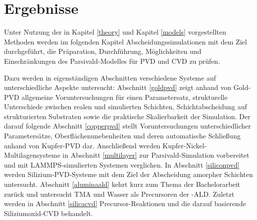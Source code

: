 \cleardoublepage
\chapter{Ergebnisse}

Unter Nutzung der in Kapitel \ref{theory} und Kapitel \ref{models} vorgestellten Methoden werden im folgenden Kapitel Abscheidungssimulationen mit dem Ziel durchgeführt, die Präparation, Durchführung, Möglichkeiten und Einschränkungen des Parsivald-Modelles für PVD und CVD zu prüfen.

Dazu werden in eigenständigen Abschnitten verschiedene Systeme auf unterschiedliche Aspekte untersucht:
Abschnitt \ref{goldpvd} zeigt anhand von Gold-PVD allgemeine Voruntersuchungen für einen Parametersatz, strukturelle Unterschiede zwischen realen und simulierten Schichten, Schichtabscheidung auf strukturierten Substraten sowie die praktische Skalierbarkeit der Simulation.
Der darauf folgende Abschnitt \ref{copperpvd} stellt Voruntersuchungen unterschiedlicher Parametersätze, Oberflächenunebenheiten und deren automatische Schließung anhand von Kupfer-PVD dar.
Anschließend werden Kupfer-Nickel-Multilagensysteme in Abschnitt \ref{multilayer} zur Parsivald-Simulation vorbereitet und mit LAMMPS-simulierten Systemen verglichen.
In Abschnitt \ref{siliconpvd} werden Silizium-PVD-Systeme mit dem Ziel der Abscheidung amorpher Schichten untersucht.
Abschnitt \ref{aluminaald} kehrt kurz zum Thema der Bachelorarbeit zurück und untersucht TMA und Wasser als Precursoren der -ALD.
Zuletzt werden in Abschnitt \ref{silicacvd} Precursor-Reaktionen und die darauf basierende Siliziumoxid-CVD behandelt.


\clearpage

\clearpage

\clearpage

\clearpage

\clearpage


